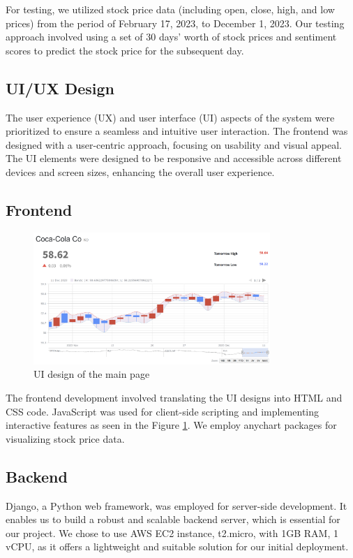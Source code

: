 For testing, we utilized stock price data (including open, close, high, and low prices) from the period of February 17, 2023, to December 1, 2023. 
Our testing approach involved using a set of 30 days' worth of stock prices and sentiment scores to predict the stock price for the subsequent day.

\subsection{UI/UX Design}
The user experience (UX) and user interface (UI) aspects of the system were prioritized to ensure a seamless and intuitive user interaction. 
The frontend was designed with a user-centric approach, focusing on usability and visual appeal.
The UI elements were designed to be responsive and accessible across different devices and screen sizes, enhancing the overall user experience.



\subsection{Frontend}
\begin{figure}
	\centering
	\includegraphics[width=0.8\textwidth]{Fig/Front.png}
	\caption{UI design of the main page}
	\label{fig:fig1}
\end{figure}

The frontend development involved translating the UI designs into HTML and CSS code.
JavaScript was used for client-side scripting and implementing interactive features as seen in the Figure \ref{fig:fig1}.
We employ anychart packages for visualizing stock price data.


\subsection{Backend}
Django, a Python web framework, was employed for server-side development.
It enables us to build a robust and scalable backend server, which is essential for our project.
We chose to use AWS EC2 instance, t2.micro, with 1GB RAM, 1 vCPU, as it offers a lightweight and suitable solution for our initial deployment.